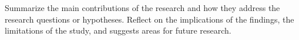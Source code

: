 Summarize the main contributions of the research and how
they address the research questions or hypotheses.
Reflect on the implications of the findings, the limitations of the study,
and suggests areas for future research.
